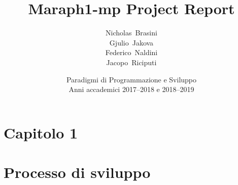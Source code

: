 \title{\LARGE{\textbf{Maraph1-mp Project Report}}}

\author{%
    Nicholas~Brasini\\%
    Gjulio~Jakova\\%
    Federico~Naldini\\%
    Jacopo~Riciputi
}

\date{%
    \small{Paradigmi di Programmazione e Sviluppo}\\%
    \small{Anni accademici 2017--2018 e 2018--2019}
}



	
    \maketitle
    \clearpage
	\tableofcontents
	\clearpage
	\setcounter{figure}{0}
    \section*{\Huge {Capitolo 1}\label{chapter1}}
      \section{Processo di sviluppo}\label{sec:process}
